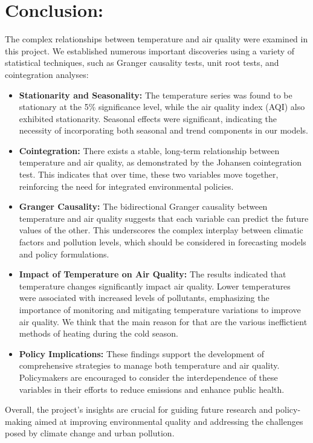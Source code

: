\documentclass{article} %
\begin{document}
\section*{Conclusion:}

The complex relationships between temperature and air quality were examined in this project. We established numerous important discoveries using a variety of statistical techniques, such as Granger causality tests, unit root tests, and cointegration analyses:
\begin{itemize}
    \item \textbf{Stationarity and Seasonality:} The temperature series was found to be stationary at the 5\% significance level, while the air quality index (AQI) also exhibited stationarity. Seasonal effects were significant, indicating the necessity of incorporating both seasonal and trend components in our models.
    \item \textbf{Cointegration:} There exists a stable, long-term relationship between temperature and air quality, as demonstrated by the Johansen cointegration test. This indicates that over time, these two variables move together, reinforcing the need for integrated environmental policies.
    \item \textbf{Granger Causality:} The bidirectional Granger causality between temperature and air quality suggests that each variable can predict the future values of the other. This underscores the complex interplay between climatic factors and pollution levels, which should be considered in forecasting models and policy formulations.
    \item \textbf{Impact of Temperature on Air Quality:} The results indicated that temperature changes significantly impact air quality. Lower temperatures were associated with increased levels of pollutants, emphasizing the importance of monitoring and mitigating temperature variations to improve air quality. We think that the main reason for that are the various ineffictient methods of heating during the cold season.
    \item \textbf{Policy Implications:} These findings support the development of comprehensive strategies to manage both temperature and air quality. Policymakers are encouraged to consider the interdependence of these variables in their efforts to reduce emissions and enhance public health.
\end{itemize}
Overall, the project's insights are crucial for guiding future research and policy-making aimed at improving environmental quality and addressing the challenges posed by climate change and urban pollution.
\end{document}
